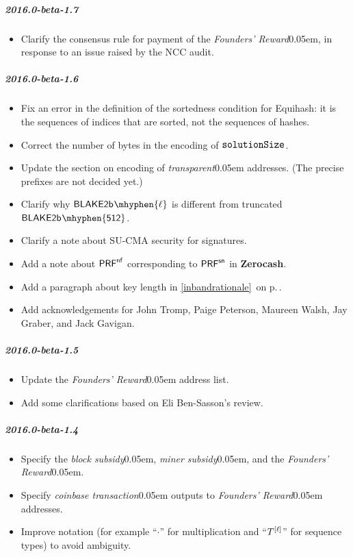 \documentclass{article}
\renewcommand{\emph}[1]{\hspace{0.15em}{\fontfamily{pnc}\selectfont\scalebox{1.02}[0.999]{\textit{#1}}}\hspace{0.02em}}
\let\oldmathtt\mathtt
\renewcommand{\mathtt}[1]{\scalebox{1.02}[1.07]{$\oldmathtt{#1}$}}
\newcommand{\crossref}[1]{\autoref{#1}\, \emph{`\nameref*{#1}\kern -0.05em'} on p.\,\pageref*{#1}}
\newcommand{\introlist}{\needspace{15ex}}
\newcommand{\term}[1]{\textsl{#1}\kern 0.05em\xspace}
\newcommand{\termbf}[1]{\textbf{#1}\xspace}
\newcommand{\Zerocash}{\termbf{Zerocash}}
\newcommand{\coinbaseTransaction}{\term{coinbase transaction}}
\newcommand{\transparent}{\term{transparent}}
\newcommand{\typeexp}[2]{{#1}\vphantom{)}^{[{#2}]}}
\newcommand{\Blake}[1]{\mathsf{BLAKE2b\kern 0.05em\mhyphen{#1}}}
\newcommand{\mult}{\cdot}
\newcommand{\PRF}[2]{\mathsf{{PRF}^{#2}_\mathnormal{#1}}}
\newcommand{\PRFnf}[1]{\PRF{#1}{\nf}}
\newcommand{\PRFsn}[1]{\PRF{#1}{sn}}
\newcommand{\nf}{\mathsf{nf}}
\newcommand{\blockSubsidy}{\term{block subsidy}}
\newcommand{\minerSubsidy}{\term{miner subsidy}}
\newcommand{\foundersReward}{\term{Founders' Reward}}
\newcommand{\solutionSize}{\mathtt{solutionSize}}
\begin{document}
\introlist
\subparagraph{2016.0-beta-1.7}

\begin{itemize}
    \item Clarify the consensus rule for payment of the \foundersReward, in
          response to an issue raised by the NCC audit.
\end{itemize}

\introlist
\subparagraph{2016.0-beta-1.6}

\begin{itemize}
    \item Fix an error in the definition of the sortedness condition for Equihash:
          it is the sequences of indices that are sorted, not the sequences of
          hashes.
    \item Correct the number of bytes in the encoding of $\solutionSize$.
    \item Update the section on encoding of \transparent addresses.
          (The precise prefixes are not decided yet.)
    \item Clarify why $\Blake{\ell}$ is different from truncated $\Blake{512}$.
    \item Clarify a note about SU-CMA security for signatures.
    \item Add a note about $\PRFnf{}$ corresponding to $\PRFsn{}$ in \Zerocash.
    \item Add a paragraph about key length in \crossref{inbandrationale}.
    \item Add acknowledgements for John Tromp, Paige Peterson, Maureen Walsh,
          Jay Graber, and Jack Gavigan.
\end{itemize}

\introlist
\subparagraph{2016.0-beta-1.5}

\begin{itemize}
    \item Update the \foundersReward address list.
    \item Add some clarifications based on Eli Ben-Sasson's review.
\end{itemize}

\introlist
\subparagraph{2016.0-beta-1.4}

\begin{itemize}
    \item Specify the \blockSubsidy, \minerSubsidy, and the \foundersReward.
    \item Specify \coinbaseTransaction outputs to \foundersReward addresses.
    \item Improve notation (for example ``$\mult$'' for multiplication and
          ``$\typeexp{T}{\ell}$'' for sequence types) to avoid ambiguity.
\end{itemize}
\end{document}

